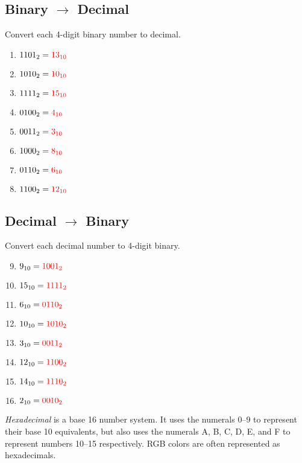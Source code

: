 \documentclass{article}
\begin{document}
\begin{multicols}{2}
\subsection*{Binary $\rightarrow$ Decimal}
Convert each 4-digit binary number to decimal.
\vspace{0.5cm}

\begin{enumerate}[label=\arabic*.]
    \item $1101_2 = \textcolor{red}{13_{10}}$
    \item $1010_2 = \textcolor{red}{10_{10}}$
    \item $1111_2 = \textcolor{red}{15_{10}}$
    \item $0100_2 = \textcolor{red}{4_{10}}$
    \item $0011_2 = \textcolor{red}{3_{10}}$
    \item $1000_2 = \textcolor{red}{8_{10}}$
    \item $0110_2 = \textcolor{red}{6_{10}}$
    \item $1100_2 = \textcolor{red}{12_{10}}$
\end{enumerate}

\subsection*{Decimal $\rightarrow$ Binary}
Convert each decimal number to 4-digit binary.
\vspace{0.5cm}

\begin{enumerate}[label=\arabic*.]
    \setcounter{enumi}{8}
    \item $9_{10} = \textcolor{red}{1001_2}$
    \item $15_{10} = \textcolor{red}{1111_2}$
    \item $6_{10} = \textcolor{red}{0110_2}$
    \item $10_{10} = \textcolor{red}{1010_2}$
    \item $3_{10} = \textcolor{red}{0011_2}$
    \item $12_{10} = \textcolor{red}{1100_2}$
    \item $14_{10} = \textcolor{red}{1110_2}$
    \item $2_{10} = \textcolor{red}{0010_2}$
\end{enumerate}

\end{multicols}
\newpage

\emph{Hexadecimal} is a base 16 number system. It uses the numerals 0--9 to represent their base 10 equivalents, but also uses the numerals A, B, C, D, E, and F to represent numbers 10--15 respectively. RGB colors are often represented as hexadecimals.
\end{document}
